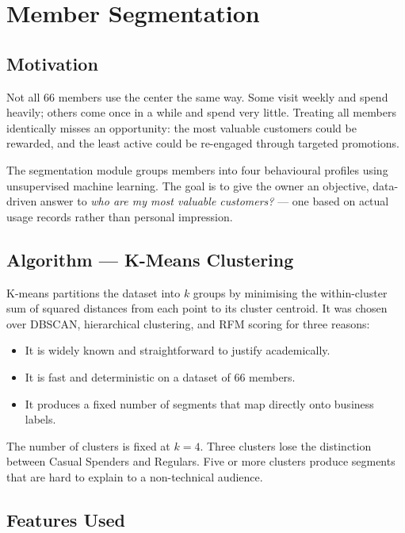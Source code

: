\section{Member Segmentation}

\subsection{Motivation}

Not all 66 members use the center the same way. Some visit weekly and spend heavily;
others come once in a while and spend very little. Treating all members identically
misses an opportunity: the most valuable customers could be rewarded, and the least
active could be re-engaged through targeted promotions.

The segmentation module groups members into four behavioural profiles using unsupervised
machine learning. The goal is to give the owner an objective, data-driven answer to
\textit{who are my most valuable customers?} --- one based on actual usage records
rather than personal impression.

\subsection{Algorithm --- K-Means Clustering}

K-means partitions the dataset into $k$ groups by minimising the within-cluster sum of
squared distances from each point to its cluster centroid. It was chosen over DBSCAN,
hierarchical clustering, and RFM scoring for three reasons:

\begin{itemize}[noitemsep]
  \item It is widely known and straightforward to justify academically.
  \item It is fast and deterministic on a dataset of 66 members.
  \item It produces a fixed number of segments that map directly onto business labels.
\end{itemize}

The number of clusters is fixed at $k=4$. Three clusters lose the distinction between
Casual Spenders and Regulars. Five or more clusters produce segments that are hard to
explain to a non-technical audience.

\subsection{Features Used}

